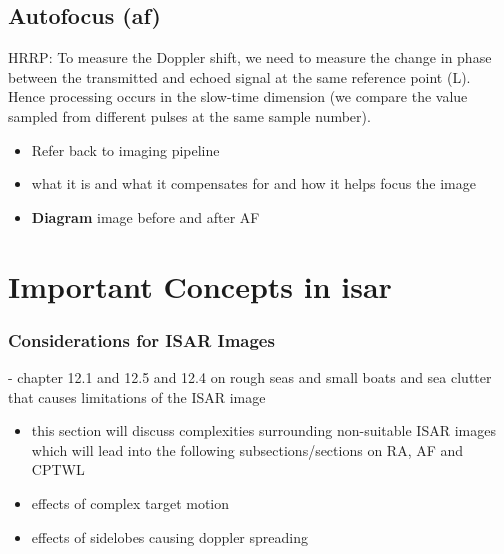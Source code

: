 \documentclass[class=report,11pt,crop=false]{standalone}
\begin{document}
    \subsection{Autofocus (\gls{af})}
    HRRP: To measure the Doppler shift, we need to measure the change in phase between the transmitted and echoed signal at the same reference point (L). Hence processing occurs in the slow-time dimension (we compare the value sampled from different pulses at the same sample number). 
    \begin{itemize}
        \item Refer back to imaging pipeline
        \item what it is and what it compensates for and how it helps focus the image
        \item \textbf{Diagram} image before and after AF
    \end{itemize}

\section{Important Concepts in \gls{isar}} \label{sec:theory_isar_complications}

    \subsubsection{Considerations for ISAR Images}
    - chapter 12.1 and 12.5 and 12.4 on rough seas and small boats and sea clutter that causes limitations of the ISAR image
    \begin{itemize}
        \item this section will discuss complexities surrounding non-suitable ISAR images which will lead into the following subsections/sections on RA, AF and CPTWL
        \item effects of complex target motion
        \item effects of sidelobes causing doppler spreading
    \end{itemize}

\end{document}
